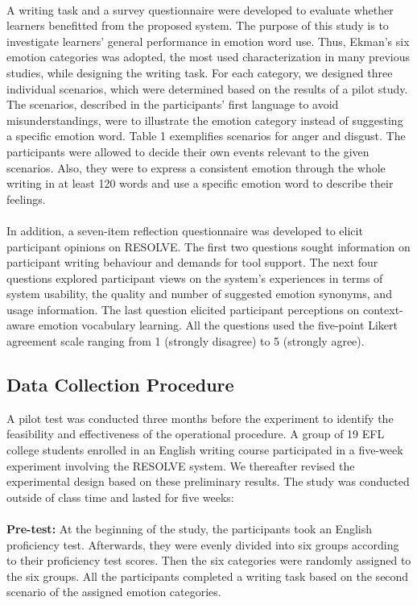 \documentclass[a4paper,12pt,oneside]{article}
\begin{document}
\paragraph{}
A writing task and a survey questionnaire were developed to evaluate whether learners benefitted from the proposed system. The purpose of this study is to investigate learners’ general performance in emotion word use. Thus, Ekman’s six emotion categories was adopted, the most used characterization in many previous studies, while designing the writing task. For each category, we designed three individual scenarios, which were determined based on the results of a pilot study. The scenarios, described in the participants’ first language to avoid misunderstandings, were to illustrate the emotion category instead of suggesting a specific emotion word. Table 1 exemplifies scenarios for anger and disgust. The participants were allowed to decide their own events relevant to the given scenarios. Also, they were to express a consistent emotion through the whole writing in at least 120 words and use a specific emotion word to describe their feelings. 
\paragraph{}
In addition, a seven-item reflection questionnaire was developed to elicit participant opinions on RESOLVE. The first two questions sought information on participant writing behaviour and demands for tool support. The next four questions explored participant views on the system’s experiences in terms of system usability, the quality and number of suggested emotion synonyms, and usage information. The last question elicited participant perceptions on context-aware emotion vocabulary learning. All the questions used the five-point Likert agreement scale ranging from 1 (strongly disagree) to 5 (strongly agree). 

\subsection{Data Collection Procedure}
A pilot test was conducted three months before the experiment to identify the feasibility and effectiveness of the operational procedure. A group of 19 EFL college students enrolled in an English writing course participated in a five-week experiment involving the RESOLVE system. We thereafter revised the experimental design based on these preliminary results. The study was conducted outside of class time and lasted for five weeks: 
\paragraph{}
\textbf{Pre-test:} At the beginning of the study, the participants took an English proficiency test. Afterwards, they were evenly divided into six groups according to their proficiency test scores. Then the six categories were randomly assigned to the six groups. All the participants completed a writing task based on the second scenario of the assigned emotion categories. 
\end{document}
